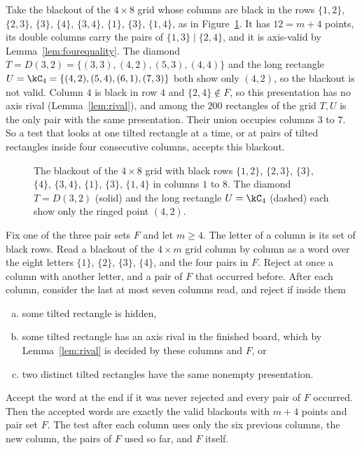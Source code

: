 \begin{example}\label{ex:fourwidtheight}
Take the blackout of the $4\times8$ grid whose columns are black in the rows $\{1,2\}$, $\{2,3\}$, $\{3\}$, $\{4\}$, $\{3,4\}$, $\{1\}$, $\{3\}$, $\{1,4\}$, as in Figure~\ref{fig:widtheight}. It has $12=m+4$ points, its double columns carry the pairs of $\{1,3\}\mid\{2,4\}$, and it is axis-valid by Lemma~\ref{lem:fourequality}. The diamond $T=D(3,2)=\{(3,3),(4,2),(5,3),(4,4)\}$ and the long rectangle $U=\kC_4=\{(4,2),(5,4),(6,1),(7,3)\}$ both show only $(4,2)$, so the blackout is not valid. Column $4$ is black in row $4$ and $\{2,4\}\notin F$, so this presentation has no axis rival (Lemma~\ref{lem:rival}), and among the $200$ rectangles of the grid $T,U$ is the only pair with the same presentation. Their union occupies columns $3$ to $7$. So a test that looks at one tilted rectangle at a time, or at pairs of tilted rectangles inside four consecutive columns, accepts this blackout.
\end{example}

\begin{figure}[t]
\centering

\caption{The blackout of the $4\times8$ grid with black rows $\{1,2\}$, $\{2,3\}$, $\{3\}$, $\{4\}$, $\{3,4\}$, $\{1\}$, $\{3\}$, $\{1,4\}$ in columns $1$ to $8$. The diamond $T=D(3,2)$ (solid) and the long rectangle $U=\kC_4$ (dashed) each show only the ringed point $(4,2)$.}
\label{fig:widtheight}
\end{figure}

\begin{theorem}\label{thm:fourmemory}
Fix one of the three pair sets $F$ and let $m\ge4$. The letter of a column is its set of black rows. Read a blackout of the $4\times m$ grid column by column as a word over the eight letters $\{1\}$, $\{2\}$, $\{3\}$, $\{4\}$, and the four pairs in $F$. Reject at once a column with another letter, and a pair of $F$ that occurred before. After each column, consider the last at most seven columns read, and reject if inside them
\begin{enumerate}[(a)]
\item some tilted rectangle is hidden,
\item some tilted rectangle has an axis rival in the finished board, which by Lemma~\ref{lem:rival} is decided by these columns and $F$, or
\item two distinct tilted rectangles have the same nonempty presentation.
\end{enumerate}
Accept the word at the end if it was never rejected and every pair of $F$ occurred. Then the accepted words are exactly the valid blackouts with $m+4$ points and pair set $F$. The test after each column uses only the six previous columns, the new column, the pairs of $F$ used so far, and $F$ itself.
\end{theorem}


